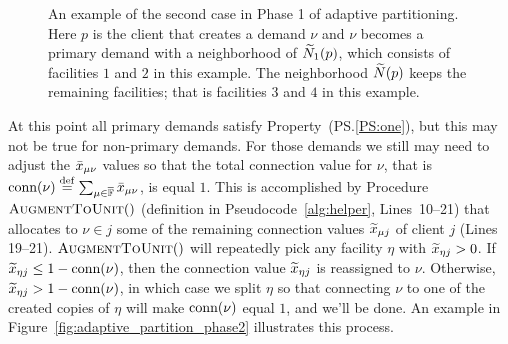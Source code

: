 \documentclass[oneside,final]{ucr}
\def\dsp{\def\baselinestretch{2.0}\large\normalsize}
\def\ssp{\def\baselinestretch{1.0}\large\normalsize}
\begin{document}
\ssp
\begin{figure}[ht]
  \centering
    \caption[An example of the second case in Phase 1 of
    adaptive partitioning.]{An example of the second case in
      Phase 1 of adaptive partitioning. Here $p$ is the
      client that creates a demand $\nu$ and $\nu$ becomes a
      primary demand with a neighborhood of ${\widetilde N}_1(p)$,
      which consists of facilities $1$ and $2$ in this
      example. The neighborhood ${\widetilde N}(p)$ keeps the
      remaining facilities; that is facilities $3$ and $4$
      in this example.}
  \label{fig:adaptive_partition_disjoint}
\end{figure}
\dsp

At this point all primary demands satisfy
Property~(PS.\ref{PS:one}), but this may not be true for
non-primary demands. For those demands we still may need to
adjust the ${\bar x}_{\mu\nu}$ values so that the total
connection value for $\nu$, that is ${\textrm{conn}}(\nu) \stackrel{\mathrm{def}}{=}
\sum_{\mu\in\overline{\mathbb{F}}}{\bar x}_{\mu \nu}$, is equal $1$. This
is accomplished by Procedure ${\textsc{AugmentToUnit}}()$ (definition
in Pseudocode~\ref{alg:helper}, Lines~10--21) that allocates
to $\nu\in j$ some of the remaining connection values
${\widetilde x}_{\mu j}$ of client $j$ (Lines 19--21).
${\textsc{AugmentToUnit}}()$ will repeatedly pick any facility $\eta$ with
${\widetilde x}_{\eta j} >0$.  If ${\widetilde x}_{\eta j} \leq
1-{\textrm{conn}}(\nu)$, then the connection value ${\widetilde x}_{\eta
  j}$ is reassigned to $\nu$. 
Otherwise, ${\widetilde x}_{\eta j} >
1-{\textrm{conn}}(\nu)$, in which case we split $\eta$ so that
connecting $\nu$ to one of the created copies of $\eta$ will
make ${\textrm{conn}}(\nu)$ equal $1$, and we'll be done. An
example in Figure~\ref{fig:adaptive_partition_phase2}
illustrates this process.
\end{document}

